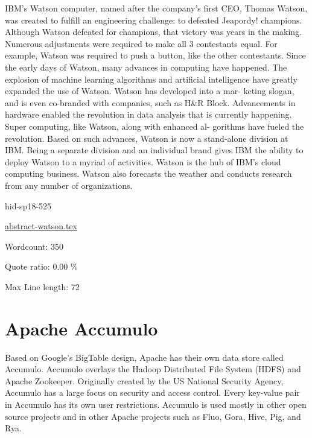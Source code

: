 IBM’s Watson computer, named after the company’s first CEO, Thomas
Watson, was created to fulfill an engineering challenge: to defeated
Jeapordy! champions\cite{hid-sp18-525-watson}. Although Watson defeated
for champions, that victory was years in the making.  Numerous
adjustments were required to make all 3 contestants equal.  For
example, Watson was required to push a button, like the other
contestants\cite{hid-sp18-525-watson}. Since the early days of Watson,
many advances in computing have happened. The explosion of machine
learning algorithms and artificial intelligence have greatly expanded
the use of Watson. Watson has developed into a mar- keting slogan, and
is even co-branded with companies, such as H\&R
Block\cite{hid-sp18-525-watson}. Advancements in hardware enabled the
revolution in data analysis that is currently happening. Super
computing, like Watson, along with enhanced al- gorithms have fueled
the revolution. Based on such advances, Watson is now a stand-alone
division at IBM\cite{hid-sp18-525-watson}. Being a separate division and
an individual brand gives IBM the ability to deploy Watson to a myriad
of activities. Watson is the hub of IBM’s cloud computing business.
Watson also forecasts the weather and conducts research from any
number of organizations\cite{hid-sp18-525-watson}.



\begin{IU}

hid-sp18-525

\href{https://github.com/cloudmesh-community/hid-sp18-525/blob/master//technology/abstract-watson.tex}{abstract-watson.tex}

 

Wordcount: 350


Quote ratio: 0.00 \%
 
Max Line length: 72
\end{IU}

\section{Apache Accumulo}

Based on Google's BigTable design, Apache has their own data store called
Accumulo\cite{hid-sp18-526-www-apache-accumulo}. Accumulo overlays the
Hadoop Distributed File System (HDFS) and Apache Zookeeper. Originally
created by the US National Security Agency, Accumulo has a large focus on
security and access control. Every key-value pair in Accumulo has its own
user restrictions. Accumulo is used mostly in other open source projects
and in other Apache projects such as Fluo, Gora, Hive, Pig, and Rya.

